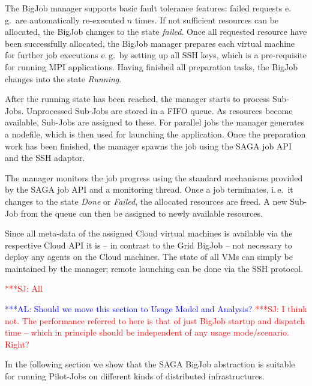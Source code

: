 \documentclass[conference,final]{IEEEtran}
\newcommand{\alnote}[1]{ {\textcolor{blue} { ***AL: #1 }}}
\newcommand{\jhanote}[1]{ {\textcolor{red} { ***SJ: #1 }}}
\newcommand{\alnote}[1]{}
\newcommand{\jhanote}[1]{}
\begin{document}
The BigJob manager supports basic fault tolerance features: failed requests e.\,g.\
are automatically re-executed $n$ times. If not sufficient resources can be
allocated, the BigJob changes to the state \emph{failed}.
Once all requested resource have been successfully allocated, the BigJob manager
prepares each virtual machine for further job executions e.\,g.\ by setting
up all SSH keys, which is a pre-requisite for running MPI applications.
Having finished all preparation tasks, the BigJob changes into the state
\emph{Running}. 

After the running state has been reached, the manager starts to process Sub-Jobs.
Unprocessed Sub-Jobs are stored in a FIFO queue. As resources become available,
Sub-Jobs are assigned to these. For parallel jobs the manager generates
a nodefile, which is then used for launching the application. Once the preparation
work has been finished, the manager spawns the job using the SAGA job API and the SSH
adaptor. 

The manager monitors the job progress using the standard mechanisms provided by the
SAGA job API and a monitoring thread. Once a job terminates, i.\,e.\ it changes 
to the state \emph{Done} or \emph{Failed}, the allocated resources are freed. 
A new Sub-Job from the queue can then be assigned to newly available resources.

Since all meta-data of the assigned Cloud virtual machines is available via 
the respective Cloud API it is -- in contrast to the Grid BigJob -- not necessary 
to deploy any agents on the Cloud machines. The state of all VMs can simply be 
maintained by the manager; remote launching can be done via the SSH protocol.


 \jhanote{All}

\alnote{Should we move this section to Usage Model and Analysis?}
\jhanote{I think not. The performance referred to here is that of just
  BigJob startup and dispatch time -- which in principle should be
  independent of any usage mode/scenario. Right?}


In the following section we show that the SAGA BigJob abstraction is
suitable for running Pilot-Jobs on different kinds of distributed
infrastructures.
\end{document}
